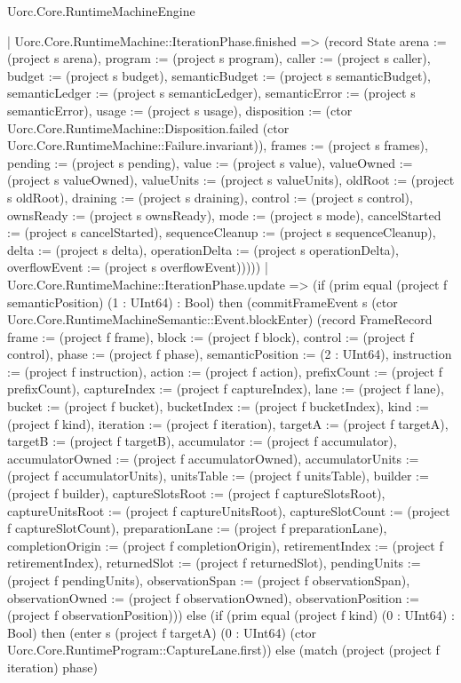 \begin{lexlean}{Uorc.Core.RuntimeMachineEngine}
\begin{semanticmodule}
{        | Uorc.Core.RuntimeMachine::IterationPhase.finished => (record State {arena := (project s arena), program := (project s program), caller := (project s caller), budget := (project s budget), semanticBudget := (project s semanticBudget), semanticLedger := (project s semanticLedger), semanticError := (project s semanticError), usage := (project s usage), disposition := (ctor Uorc.Core.RuntimeMachine::Disposition.failed (ctor Uorc.Core.RuntimeMachine::Failure.invariant)), frames := (project s frames), pending := (project s pending), value := (project s value), valueOwned := (project s valueOwned), valueUnits := (project s valueUnits), oldRoot := (project s oldRoot), draining := (project s draining), control := (project s control), ownsReady := (project s ownsReady), mode := (project s mode), cancelStarted := (project s cancelStarted), sequenceCleanup := (project s sequenceCleanup), delta := (project s delta), operationDelta := (project s operationDelta), overflowEvent := (project s overflowEvent)}))))
      | Uorc.Core.RuntimeMachine::IterationPhase.update => (if (prim equal (project f semanticPosition) (1 : UInt64) : Bool) then (commitFrameEvent s (ctor Uorc.Core.RuntimeMachineSemantic::Event.blockEnter) (record FrameRecord {frame := (project f frame), block := (project f block), control := (project f control), phase := (project f phase), semanticPosition := (2 : UInt64), instruction := (project f instruction), action := (project f action), prefixCount := (project f prefixCount), captureIndex := (project f captureIndex), lane := (project f lane), bucket := (project f bucket), bucketIndex := (project f bucketIndex), kind := (project f kind), iteration := (project f iteration), targetA := (project f targetA), targetB := (project f targetB), accumulator := (project f accumulator), accumulatorOwned := (project f accumulatorOwned), accumulatorUnits := (project f accumulatorUnits), unitsTable := (project f unitsTable), builder := (project f builder), captureSlotsRoot := (project f captureSlotsRoot), captureUnitsRoot := (project f captureUnitsRoot), captureSlotCount := (project f captureSlotCount), preparationLane := (project f preparationLane), completionOrigin := (project f completionOrigin), retirementIndex := (project f retirementIndex), returnedSlot := (project f returnedSlot), pendingUnits := (project f pendingUnits), observationSpan := (project f observationSpan), observationOwned := (project f observationOwned), observationPosition := (project f observationPosition)})) else (if (prim equal (project f kind) (0 : UInt64) : Bool) then (enter s (project f targetA) (0 : UInt64) (ctor Uorc.Core.RuntimeProgram::CaptureLane.first)) else (match (project (project f iteration) phase)
}
\end{semanticmodule}
\end{lexlean}

